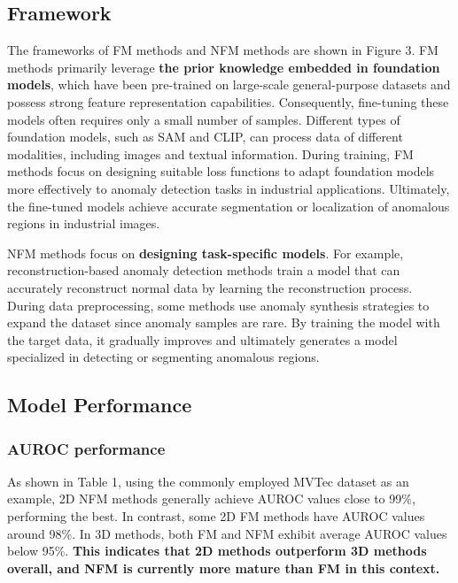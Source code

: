 \documentclass[journal,comsoc]{IEEEtran}
\begin{document}
\subsection{Framework}
The frameworks of FM methods and NFM methods are shown in Figure 3. FM methods primarily leverage \textbf{the prior knowledge embedded in foundation models}, which have been pre-trained on large-scale general-purpose datasets and possess strong feature representation capabilities. Consequently, fine-tuning these models often requires only a small number of samples. Different types of foundation models, such as SAM and CLIP, can process data of different modalities, including images and textual information. During training, FM methods focus on designing suitable loss functions to adapt foundation models more effectively to anomaly detection tasks in industrial applications. Ultimately, the fine-tuned models achieve accurate segmentation or localization of anomalous regions in industrial images.

NFM methods focus on \textbf{designing task-specific models}. For example, reconstruction-based anomaly detection methods train a model that can accurately reconstruct normal data by learning the reconstruction process. During data preprocessing, some methods use anomaly synthesis strategies to expand the dataset since anomaly samples are rare. By training the model with the target data, it gradually improves and ultimately generates a model specialized in detecting or segmenting anomalous regions.


\subsection{Model Performance}
\subsubsection{AUROC performance}
As shown in Table 1, using the commonly employed MVTec dataset as an example, 2D NFM methods generally achieve AUROC values close to 99\%, performing the best. In contrast, some 2D FM methods have AUROC values around 98\%. In 3D methods, both FM and NFM exhibit average AUROC values below 95\%. \textbf{This indicates that 2D methods outperform 3D methods overall, and NFM is currently more mature than FM in this context.}
\end{document}
